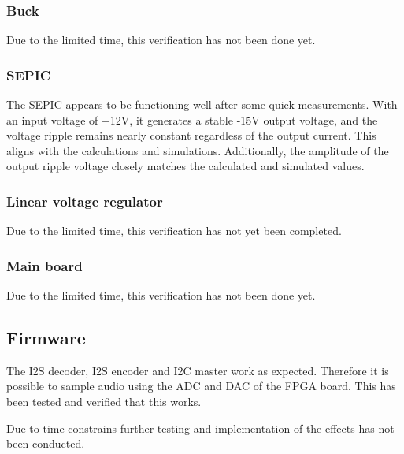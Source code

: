 \subsubsection{Buck}
Due to the limited time, this verification has not been done yet.

\subsubsection{SEPIC}
The SEPIC appears to be functioning well after some quick measurements. With an input voltage of +12V, it generates a stable -15V output voltage, and the voltage ripple remains nearly constant regardless of the output current. This aligns with the calculations and simulations. Additionally, the amplitude of the output ripple voltage closely matches the calculated and simulated values.

\subsubsection{Linear voltage regulator}
Due to the limited time, this verification has not yet been completed.

\subsubsection{Main board}
Due to the limited time, this verification has not been done yet.

\subsection{Firmware}
The I2S decoder, I2S encoder and I2C master work as expected. Therefore it is possible to sample audio using the ADC and DAC of the FPGA board. This has been tested and verified that this works. 

Due to time constrains further testing and implementation of the effects has not been conducted. 
